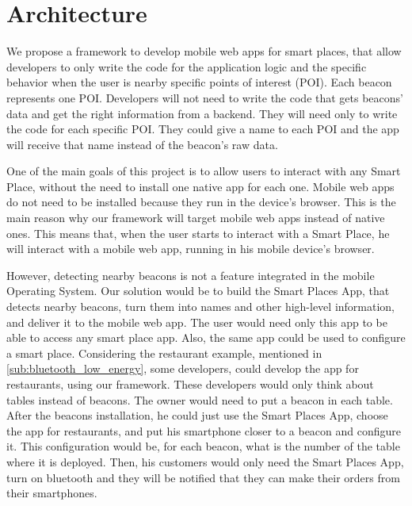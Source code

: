 
% 
% 

\section{Architecture}
\label{sec:architecture}
We propose a framework to develop mobile web apps for smart
places, that allow developers to only write the code
for the application logic and the specific behavior when
the user is nearby specific points of interest (POI).
Each beacon represents one POI. Developers will not need
to write the code that gets beacons' data and get the
right information from a backend. They will need only
to write the code for each specific POI. They could give
a name to each POI and the app will receive that name 
instead of the beacon's raw data. 

One of the main goals of this project is to allow
users to interact with any Smart Place, without
the need to install one native app for each one.
Mobile web apps do not need to be installed because
they run in the device's browser.
This is the main reason why our framework will
target mobile web apps instead of native ones.
This means that, when the user starts to interact
with a Smart Place, he will interact with a mobile
web app, running in his mobile device's browser.

However, detecting
nearby beacons is not a feature integrated in the mobile
Operating System. Our solution would be to build the
Smart Places App,
that detects nearby beacons, turn them into names and
other high-level information, and deliver it to the
mobile web app. The user would need only this app to
be able to access any smart place app. Also, the same app
could be used to configure a smart place.
Considering the restaurant example, mentioned in
\ref{sub:bluetooth_low_energy}, some
developers, could develop the app for restaurants,
using our framework. These developers would only think
about tables instead of beacons. The owner would need
to put a beacon in each table. After the beacons
installation, he could just use the Smart Places App,
choose the app for restaurants, and put his smartphone
closer to a beacon and configure it. This configuration
would be, for each beacon, what is the number of the table
where it is deployed. Then, his customers would only
need the Smart Places App, turn on bluetooth and they will
be notified that they can make their orders from their
smartphones.

